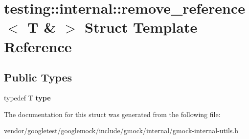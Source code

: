 \hypertarget{structtesting_1_1internal_1_1remove__reference_3_01T_01_6_01_4}{}\section{testing\+:\+:internal\+:\+:remove\+\_\+reference$<$ T \& $>$ Struct Template Reference}
\label{structtesting_1_1internal_1_1remove__reference_3_01T_01_6_01_4}
\subsection*{Public Types}
\begin{DoxyCompactItemize}
\item 
typedef T {\bfseries type}\hypertarget{structtesting_1_1internal_1_1remove__reference_3_01T_01_6_01_4_a0d72f004f54016a47c752a82be352a19}{}\label{structtesting_1_1internal_1_1remove__reference_3_01T_01_6_01_4_a0d72f004f54016a47c752a82be352a19}

\end{DoxyCompactItemize}


The documentation for this struct was generated from the following file\+:\begin{DoxyCompactItemize}
\item 
vendor/googletest/googlemock/include/gmock/internal/gmock-\/internal-\/utils.\+h\end{DoxyCompactItemize}
